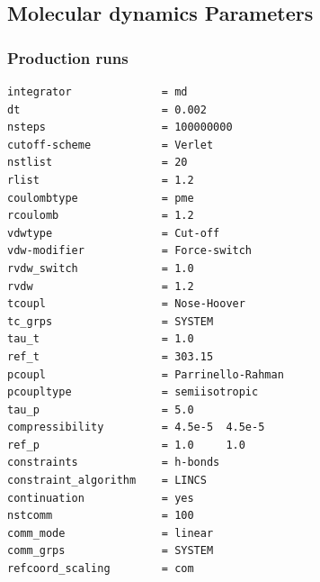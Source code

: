 \documentclass[
  twocolumn]{biophys-new-mod}
\begin{document}
\hypertarget{molecular-dynamics-parameters}{%
\subsection{Molecular dynamics
Parameters}\label{molecular-dynamics-parameters}}

\hypertarget{sec-prod-mdp}{%
\subsubsection{Production runs}\label{sec-prod-mdp}}

\begin{verbatim}
integrator              = md
dt                      = 0.002
nsteps                  = 100000000
cutoff-scheme           = Verlet
nstlist                 = 20
rlist                   = 1.2
coulombtype             = pme
rcoulomb                = 1.2
vdwtype                 = Cut-off
vdw-modifier            = Force-switch
rvdw_switch             = 1.0
rvdw                    = 1.2
tcoupl                  = Nose-Hoover
tc_grps                 = SYSTEM
tau_t                   = 1.0
ref_t                   = 303.15
pcoupl                  = Parrinello-Rahman
pcoupltype              = semiisotropic
tau_p                   = 5.0
compressibility         = 4.5e-5  4.5e-5
ref_p                   = 1.0     1.0
constraints             = h-bonds
constraint_algorithm    = LINCS
continuation            = yes
nstcomm                 = 100
comm_mode               = linear
comm_grps               = SYSTEM
refcoord_scaling        = com
\end{verbatim}
\end{document}
